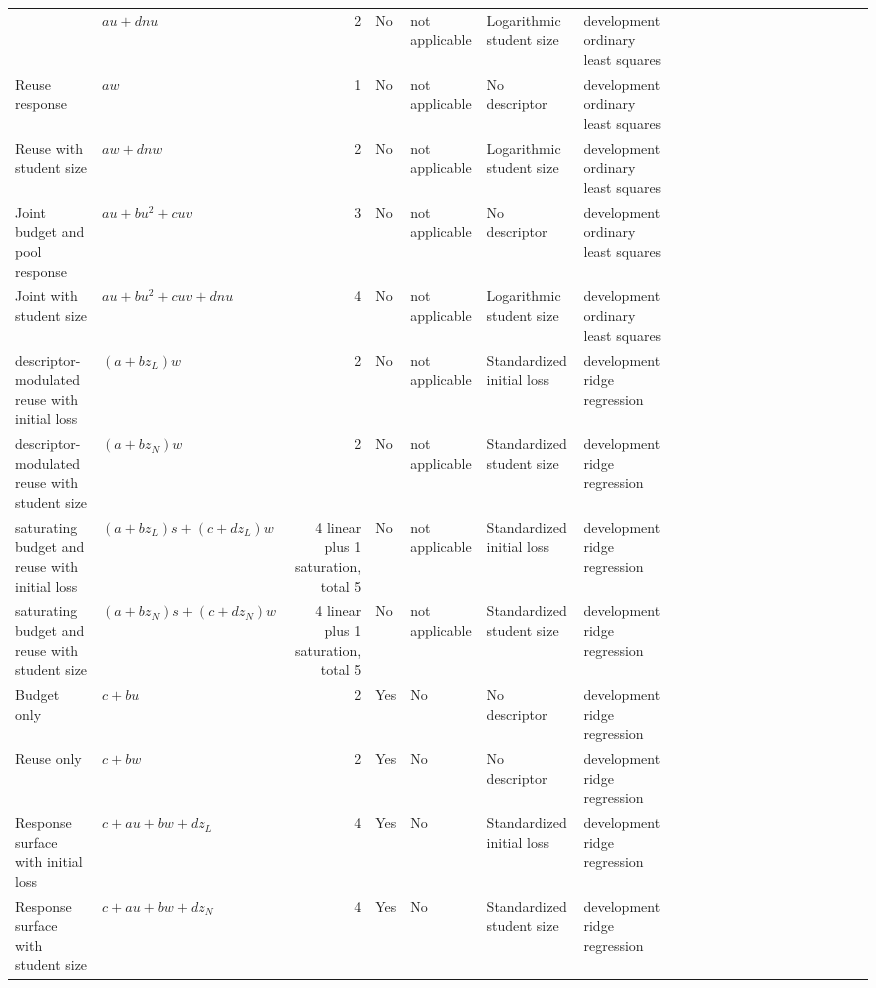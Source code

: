\begin{table}[tb]
\begin{tabular*}{\textwidth}
{Budget with student size} & $a u+d n u$ & 2 & No & not applicable & Logarithmic student size & {development ordinary least squares} \\
Reuse response & $a w$ & 1 & No & not applicable & No descriptor & {development ordinary least squares} \\
{Reuse with student size} & $a w+d n w$ & 2 & No & not applicable & Logarithmic student size & {development ordinary least squares} \\
{Joint budget and pool response} & $a u+b u^2+c u v$ & 3 & No & not applicable & No descriptor & {development ordinary least squares} \\
{Joint with student size} & $a u+b u^2+c u v+d n u$ & 4 & No & not applicable & Logarithmic student size & {development ordinary least squares} \\
descriptor-modulated reuse with initial loss & $(a+b z_L)w$ & 2 & No & not applicable & Standardized initial loss & {development ridge regression} \\
descriptor-modulated reuse with student size & $(a+b z_N)w$ & 2 & No & not applicable & Standardized student size & {development ridge regression} \\
saturating budget and reuse with initial loss & $(a+b z_L)s+(c+d z_L)w$ & 4 linear plus 1 saturation, total 5 & No & not applicable & Standardized initial loss & {development ridge regression} \\
saturating budget and reuse with student size & $(a+b z_N)s+(c+d z_N)w$ & 4 linear plus 1 saturation, total 5 & No & not applicable & Standardized student size & {development ridge regression} \\
Budget only & $c+b u$ & 2 & Yes & No & No descriptor & {development ridge regression} \\
Reuse only & $c+b w$ & 2 & Yes & No & No descriptor & {development ridge regression} \\
{Response surface with initial loss} & $c+a u+b w+d z_L$ & 4 & Yes & No & Standardized initial loss & {development ridge regression} \\
{Response surface with student size} & $c+a u+b w+d z_N$ & 4 & Yes & No & Standardized student size & {development ridge regression} \\
\bottomrule
\end{tabular*}
\end{table}
\begingroup\normalfont\scriptsize
\par\smallskip
